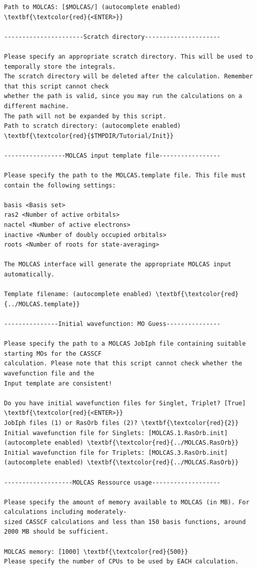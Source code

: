\documentclass[a4paper,11pt,DIV=15,openany]{scrbook}
\begin{document}
\begin{oframed}
\begin{Verbatim}[commandchars=\\\{\}]
Path to MOLCAS: [$MOLCAS/] (autocomplete enabled) \textbf{\textcolor{red}{<ENTER>}}

----------------------Scratch directory---------------------

Please specify an appropriate scratch directory. This will be used to temporally store the integrals. 
The scratch directory will be deleted after the calculation. Remember that this script cannot check 
whether the path is valid, since you may run the calculations on a different machine. 
The path will not be expanded by this script.
Path to scratch directory: (autocomplete enabled) \textbf{\textcolor{red}{$TMPDIR/Tutorial/Init}}

-----------------MOLCAS input template file-----------------

Please specify the path to the MOLCAS.template file. This file must contain the following settings:

basis <Basis set>
ras2 <Number of active orbitals>
nactel <Number of active electrons>
inactive <Number of doubly occupied orbitals>
roots <Number of roots for state-averaging>

The MOLCAS interface will generate the appropriate MOLCAS input automatically.

Template filename: (autocomplete enabled) \textbf{\textcolor{red}{../MOLCAS.template}}

---------------Initial wavefunction: MO Guess---------------

Please specify the path to a MOLCAS JobIph file containing suitable starting MOs for the CASSCF 
calculation. Please note that this script cannot check whether the wavefunction file and the 
Input template are consistent!

Do you have initial wavefunction files for Singlet, Triplet? [True] \textbf{\textcolor{red}{<ENTER>}}
JobIph files (1) or RasOrb files (2)? \textbf{\textcolor{red}{2}}
Initial wavefunction file for Singlets: [MOLCAS.1.RasOrb.init] (autocomplete enabled) \textbf{\textcolor{red}{../MOLCAS.RasOrb}}
Initial wavefunction file for Triplets: [MOLCAS.3.RasOrb.init] (autocomplete enabled) \textbf{\textcolor{red}{../MOLCAS.RasOrb}}

-------------------MOLCAS Ressource usage-------------------

Please specify the amount of memory available to MOLCAS (in MB). For calculations including moderately-
sized CASSCF calculations and less than 150 basis functions, around 2000 MB should be sufficient.

MOLCAS memory: [1000] \textbf{\textcolor{red}{500}}
Please specify the number of CPUs to be used by EACH calculation.


\end{Verbatim}
\end{oframed}
\end{document}
